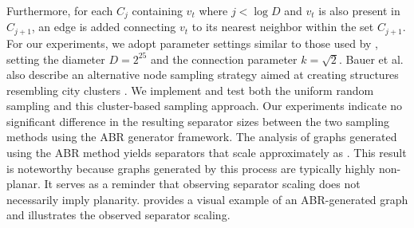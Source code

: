 Furthermore, for each \(C_j\) containing \(v_t\) where \(j < \log D\) and \(v_t\) is also present in \(C_{j+1}\), an edge is added connecting \(v_t\) to its nearest neighbor within the set \(C_{j+1}\).
For our experiments, we adopt parameter settings similar to those used by \cite{hutchison_synthetic_2010}, setting the diameter \(D = 2^{25}\) and the connection parameter \(k = \sqrt{2}\).
Bauer et al. also describe an alternative node sampling strategy aimed at creating structures resembling city clusters \cite{hutchison_synthetic_2010}.
We implement and test both the uniform random sampling and this cluster-based sampling approach.
Our experiments indicate no significant difference in the resulting separator sizes between the two sampling methods using the ABR generator framework.
The analysis of graphs generated using the ABR method yields separators that scale approximately as .
This result is noteworthy because graphs generated by this process are typically highly non-planar.
It serves as a reminder that observing  separator scaling does not necessarily imply planarity.
 provides a visual example of an ABR-generated graph and illustrates the observed separator scaling.

